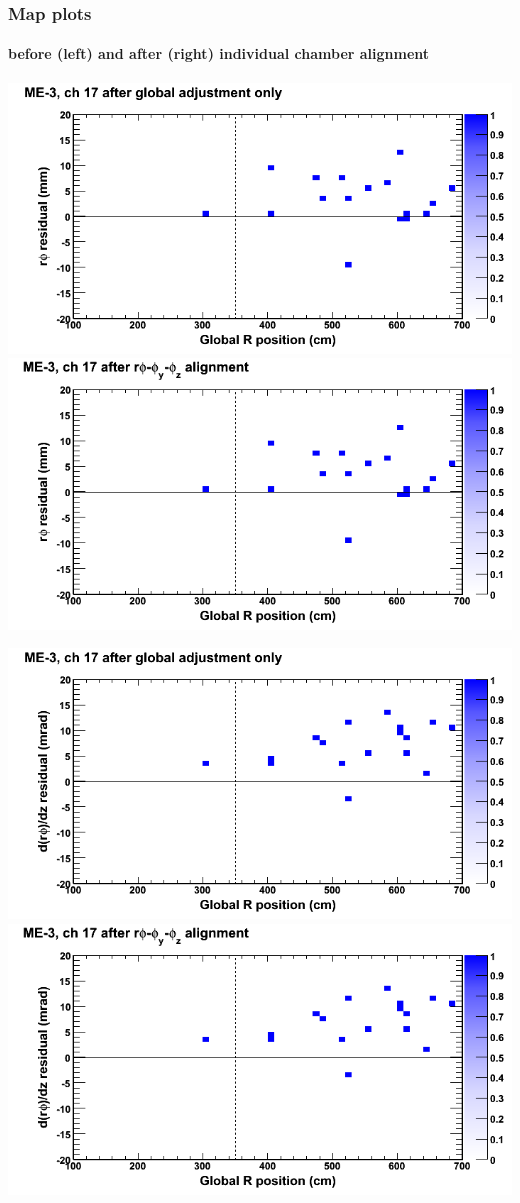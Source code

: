 \documentclass[compress]{beamer}
\begin{document}
\begin{frame}
\frametitle{Map plots}
\framesubtitle{before (left) and after (right) individual chamber alignment}
\includegraphics[width=0.5\linewidth]{ringmapplots_3dof/before_CSCvsr_mem3ch17_x.png} \includegraphics[width=0.5\linewidth]{ringmapplots_3dof/after_CSCvsr_mem3ch17_x.png}

\includegraphics[width=0.5\linewidth]{ringmapplots_3dof/before_CSCvsr_mem3ch17_dxdz.png} \includegraphics[width=0.5\linewidth]{ringmapplots_3dof/after_CSCvsr_mem3ch17_dxdz.png}
\end{frame}
\end{document}
